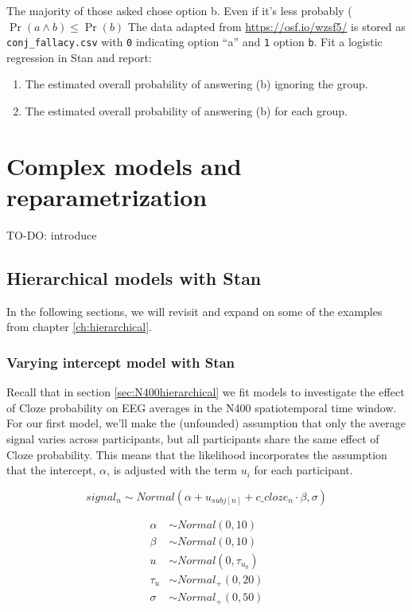 \documentclass[12pt,]{krantz}
\providecommand{\tightlist}{%
  \setlength{\itemsep}{0pt}\setlength{\parskip}{0pt}}
\theoremstyle{definition}
\theoremstyle{definition}
\theoremstyle{definition}
\theoremstyle{remark}
\begin{document}
The majority of those asked chose option b. Even if it's less probably
(\(\Pr(a\land b)\leq \Pr(b)\) The data adapted from
\url{https://osf.io/wzsf5/} is stored as \texttt{conj\_fallacy.csv} with
\texttt{0} indicating option ``a'' and \texttt{1} option \texttt{b}. Fit
a logistic regression in Stan and report:

\begin{enumerate}
\def\labelenumi{\alph{enumi}.}
\tightlist
\item
  The estimated overall probability of answering (b) ignoring the group.
\item
  The estimated overall probability of answering (b) for each group.
\end{enumerate}

\chapter{Complex models and reparametrization}\label{ch:complexstan}

TO-DO: introduce

\section{Hierarchical models with
Stan}\label{hierarchical-models-with-stan}

In the following sections, we will revisit and expand on some of the
examples from chapter \ref{ch:hierarchical}.

\subsection{Varying intercept model with
Stan}\label{varying-intercept-model-with-stan}

Recall that in section \ref{sec:N400hierarchical} we fit models to
investigate the effect of Cloze probability on EEG averages in the N400
spatiotemporal time window. For our first model, we'll make the
(unfounded) assumption that only the average signal varies across
participants, but all participants share the same effect of Cloze
probability. This means that the likelihood incorporates the assumption
that the intercept, \(\alpha\), is adjusted with the term \(u_i\) for
each participant.

\begin{equation}
  signal_n \sim Normal(\alpha + u_{subj[n]} + c\_cloze_n \cdot \beta,\sigma)
\end{equation}

\begin{equation}
 \begin{aligned}
 \alpha &\sim Normal(0,10)\\
 \beta  &\sim Normal(0,10)\\
 u &\sim Normal(0,\tau_{u_0})\\
 \tau_{u} &\sim Normal_+(0,20) \\
 \sigma  &\sim Normal_+(0,50)
 \end{aligned}
 \end{equation}
\end{document}

